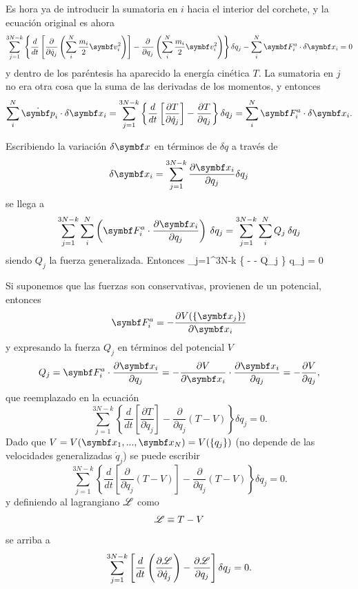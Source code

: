 \documentclass[10pt,oneside]{CBFT_book}
\begin{document}
Es hora ya de introducir la sumatoria en $i$ hacia el interior del corchete, y la ecuación original es ahora 
\[
	\sum_{j=1}^{3N-k} \left\{ 
	\frac{d}{dt} \left[ \frac{\partial}{\partial \dot{q}_j}
	\left( \sum_i^N \frac{m_i}{2} \vb{v}_i^2 \right) \right] 
	- \frac{\partial}{\partial q_j} \left( \sum_i^N \frac{m_i}{2} \vb{v}_i^2 \right) \right\} \delta q_j
	- \sum_i^N  \vb{F}_i^a \cdot \delta \vb{x}_i = 0
\]
y dentro de los paréntesis ha aparecido la energía cinética $T$. La sumatoria en $j$ no era otra cosa que la suma 
de las derivadas de los momentos, y entonces
\[
	\sum_i^N \dot{\vb{p}}_i \cdot \delta \vb{x}_i =
	\sum_{j=1}^{3N-k} \left\{ \frac{d}{dt} \left[ \frac{\partial T}{\partial \dot{q}_j} \right] -
	\frac{\partial T}{\partial q_j} \right\} \delta q_j = \sum_i^N  \vb{F}_i^a \cdot \delta \vb{x}_i.
\]

Escribiendo la variación $\delta\vb{x}$ en términos de $\delta q$ a través de 
\[
	\delta\vb{x}_i = \sum_{j=1}^{3N-k} \dpar{\vb{x}_i}{q_j}\delta q_j
\]
se llega a 
\[
	\sum_{j=1}^{3N-k} \sum_i^N \left( \vb{F}_i^a \cdot \dpar{\vb{x}_i}{q_j} \right) \: \delta q_j =  
	\sum_{j=1}^{3N-k} \sum_i^N Q_j \: \delta q_j
\]
siendo $Q_j$ la fuerza generalizada. Entonces
\be
	\sum_{j=1}^{3N-k} \left\{ 
	 -  - Q_j \right\} \delta q_j =  0
	\label{eq_el_0}
\ee

Si suponemos que las fuerzas son conservativas, provienen de un potencial, entonces 
\[
	\vb{F}_i^a = -\dpar{V(\{ \vb{x}_j \})}{\vb{x}_i}
\]
y expresando la fuerza $Q_j$ en términos del potencial $V$
\[
	Q_j = \vb{F}_i^a \cdot \dpar{\vb{x}_i}{q_j} = -\dpar{V}{\vb{x}_i} \cdot \dpar{\vb{x}_i}{q_j} = -\dpar{V}{q_j},
\]
que reemplazado en la ecuación 
\[
	\sum_{j=1}^{3N-k} \left\{ \frac{d}{dt}
	\left[ \frac{\partial T}{\partial \dot{q}_j} \right] - \frac{\partial}{\partial q_j} \left( T - V \right) \right\} \delta q_j =  0.
\]
Dado que $ V = V(\vb{x}_1,...,\vb{x}_N) = V( \{ q_j \} )$ (no depende de las velocidades generalizadas $ \dot{q}_j $) se puede escribir 
\[
	\sum_{j=1}^{3N-k} \left\{ \frac{d}{dt}
	\left[ \frac{\partial}{\partial \dot{q}_j} \left( T - V \right) \right] - 
	\frac{\partial}{\partial q_j} \left( T - V \right) \right\} \delta q_j =  0.
\]
y definiendo al lagrangiano $\mathscr{L}$ como 
\[
	\mathscr{L} \equiv T - V
\]
se arriba a
\[
	\sum_{j=1}^{3N-k} \left[
	\frac{d}{dt} \left( \frac{\partial^{\hspace{-0.05em}} {\mathscr{L}}}{\partial {\dot{q}_j}^{\hspace{-0.05em}}} \right) -  \frac{\partial^{\hspace{-0.05em}} {\mathscr{L}}}{\partial {q_j}^{\hspace{-0.05em}}} \right] \delta q_j =  0.
\]
\end{document}
